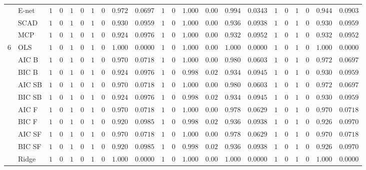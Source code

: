 \begin{tabular}{p{0.2cm}p{1cm}|p{0.6cm}p{0.6cm}|p{0.6cm}p{0.6cm}p{0.6cm}p{0.6cm}p{0.6cm}p{0.6cm}|p{0.6cm}p{0.6cm}p{0.6cm}p{0.6cm}p{0.6cm}p{0.6cm}|p{0.6cm}p{0.6cm}p{0.6cm}p{0.6cm}p{0.6cm}p{0.6cm}}
 & E-net  & $1$ & $0$ & $1$ & $0$ & $1$ & $0$ & $0.972$ & $0.0697$ & $1$ & $0$ & $1.000$ & $0.00$ & $0.994$ & $0.0343$ & $1$ & $0$ & $1$ & $0$ & $0.944$ & $0.0903$ \\
 & SCAD  & $1$ & $0$ & $1$ & $0$ & $1$ & $0$ & $0.930$ & $0.0959$ & $1$ & $0$ & $1.000$ & $0.00$ & $0.936$ & $0.0938$ & $1$ & $0$ & $1$ & $0$ & $0.930$ & $0.0959$ \\
 & MCP  & $1$ & $0$ & $1$ & $0$ & $1$ & $0$ & $0.924$ & $0.0976$ & $1$ & $0$ & $1.000$ & $0.00$ & $0.932$ & $0.0952$ & $1$ & $0$ & $1$ & $0$ & $0.932$ & $0.0952$ \\\hline
6 & OLS  & $1$ & $0$ & $1$ & $0$ & $1$ & $0$ & $1.000$ & $0.0000$ & $1$ & $0$ & $1.000$ & $0.00$ & $1.000$ & $0.0000$ & $1$ & $0$ & $1$ & $0$ & $1.000$ & $0.0000$ \\
 & AIC B  & $1$ & $0$ & $1$ & $0$ & $1$ & $0$ & $0.970$ & $0.0718$ & $1$ & $0$ & $1.000$ & $0.00$ & $0.980$ & $0.0603$ & $1$ & $0$ & $1$ & $0$ & $0.972$ & $0.0697$ \\
 & BIC B  & $1$ & $0$ & $1$ & $0$ & $1$ & $0$ & $0.924$ & $0.0976$ & $1$ & $0$ & $0.998$ & $0.02$ & $0.934$ & $0.0945$ & $1$ & $0$ & $1$ & $0$ & $0.930$ & $0.0959$ \\
 & AIC SB  & $1$ & $0$ & $1$ & $0$ & $1$ & $0$ & $0.970$ & $0.0718$ & $1$ & $0$ & $1.000$ & $0.00$ & $0.980$ & $0.0603$ & $1$ & $0$ & $1$ & $0$ & $0.972$ & $0.0697$ \\
 & BIC SB  & $1$ & $0$ & $1$ & $0$ & $1$ & $0$ & $0.924$ & $0.0976$ & $1$ & $0$ & $0.998$ & $0.02$ & $0.934$ & $0.0945$ & $1$ & $0$ & $1$ & $0$ & $0.930$ & $0.0959$ \\
 & AIC F  & $1$ & $0$ & $1$ & $0$ & $1$ & $0$ & $0.970$ & $0.0718$ & $1$ & $0$ & $1.000$ & $0.00$ & $0.978$ & $0.0629$ & $1$ & $0$ & $1$ & $0$ & $0.970$ & $0.0718$ \\
 & BIC F  & $1$ & $0$ & $1$ & $0$ & $1$ & $0$ & $0.920$ & $0.0985$ & $1$ & $0$ & $0.998$ & $0.02$ & $0.936$ & $0.0938$ & $1$ & $0$ & $1$ & $0$ & $0.926$ & $0.0970$ \\
 & AIC SF  & $1$ & $0$ & $1$ & $0$ & $1$ & $0$ & $0.970$ & $0.0718$ & $1$ & $0$ & $1.000$ & $0.00$ & $0.978$ & $0.0629$ & $1$ & $0$ & $1$ & $0$ & $0.970$ & $0.0718$ \\
 & BIC SF  & $1$ & $0$ & $1$ & $0$ & $1$ & $0$ & $0.920$ & $0.0985$ & $1$ & $0$ & $0.998$ & $0.02$ & $0.936$ & $0.0938$ & $1$ & $0$ & $1$ & $0$ & $0.926$ & $0.0970$ \\
 & Ridge  & $1$ & $0$ & $1$ & $0$ & $1$ & $0$ & $1.000$ & $0.0000$ & $1$ & $0$ & $1.000$ & $0.00$ & $1.000$ & $0.0000$ & $1$ & $0$ & $1$ & $0$ & $1.000$ & $0.0000$ \\

\end{tabular}
